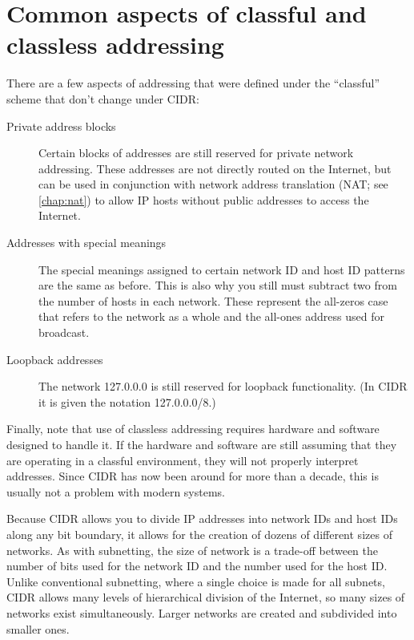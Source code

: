 \section{Common aspects of classful and classless addressing}

There are a few aspects of addressing that were defined under the ``classful'' scheme that don't change under CIDR:
\begin{description}
   \item[Private address blocks]
      Certain blocks of addresses are still reserved for private network addressing.
      These addresses are not directly routed on the Internet, but can be used in conjunction with network address translation
      (NAT; see \cref{chap:nat}) to allow IP hosts without public addresses to access the Internet.

   \item[Addresses with special meanings]
      The special meanings assigned to certain network ID and host ID patterns are the same as before.
      This is also why you still must subtract two from the number of hosts in each network.
      These represent the all-zeros case that refers to the network as a whole and the all-ones address used for broadcast.

   \item[Loopback addresses]
      The network 127.0.0.0 is still reserved for loopback functionality.
      (In CIDR it is given the notation 127.0.0.0/8.)
\end{description}

Finally, note that use of classless addressing requires hardware and
software designed to handle it. If the hardware and software are still
assuming that they are operating in a classful environment, they will
not properly interpret addresses. Since CIDR has now been around for
more than a decade, this is usually not a problem with modern systems.



Because CIDR allows you to divide IP addresses into network IDs and host
IDs along any bit boundary, it allows for the creation of dozens of
different sizes of networks. As with subnetting, the size of network is
a trade-off between the number of bits used for the network ID and the
number used for the host ID. Unlike conventional subnetting, where a
single choice is made for all subnets, CIDR allows many levels of
hierarchical division of the Internet, so many sizes of networks exist
simultaneously. Larger networks are created and subdivided into smaller
ones.

